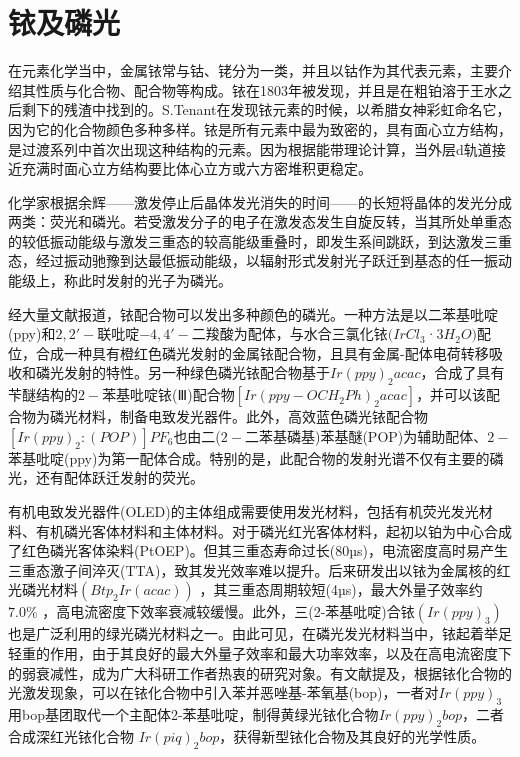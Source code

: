 \documentclass[UTF8,a4paper,10pt,twocolumn]{ctexart}
\begin{document}
\title{{\Huge{}}}
\author{\textbf{171240013 \space 于紫雯  \space 霍然  \space 刘宇杰}}
\date{}
\maketitle

\section{铱及磷光}
在元素化学当中，金属铱常与钴、铑分为一类，并且以钴作为其代表元素，主要介绍其性质与化合物、配合物等构成。铱在1803年被发现，并且是在粗铂溶于王水之后剩下的残渣中找到的。S.Tenant在发现铱元素的时候，以希腊女神彩虹命名它，因为它的化合物颜色多种多样。铱是所有元素中最为致密的，具有面心立方结构，是过渡系列中首次出现这种结构的元素。因为根据能带理论计算，当外层d轨道接近充满时面心立方结构要比体心立方或六方密堆积更稳定。

化学家根据余辉——激发停止后晶体发光消失的时间——的长短将晶体的发光分成两类：荧光和磷光。若受激发分子的电子在激发态发生自旋反转，当其所处单重态的较低振动能级与激发三重态的较高能级重叠时，即发生系间跳跃，到达激发三重态，经过振动驰豫到达最低振动能级，以辐射形式发射光子跃迁到基态的任一振动能级上，称此时发射的光子为磷光。

经大量文献报道，铱配合物可以发出多种颜色的磷光。一种方法是以二苯基吡啶(ppy)和$2,2'-$联吡啶$-4,4'-$二羧酸为配体，与水合三氯化铱$(IrCl_3$·$3H_2O)$配位，合成一种具有橙红色磷光发射的金属铱配合物，且具有金属-配体电荷转移吸收和磷光发射的特性。另一种绿色磷光铱配合物基于$Ir(ppy)_2acac$，合成了具有苄醚结构的$2-$苯基吡啶铱(Ⅲ)配合物$[Ir(ppy- OCH_2Ph)_2acac]$，并可以该配合物为磷光材料，制备电致发光器件。此外，高效蓝色磷光铱配合物$[Ir(ppy)_2:(POP)]PF_6$也由二($2-$二苯基磷基)苯基醚(POP)为辅助配体、$2-$苯基吡啶(ppy)为第一配体合成。特别的是，此配合物的发射光谱不仅有主要的磷光，还有配体跃迁发射的荧光。 

有机电致发光器件(OLED)的主体组成需要使用发光材料，包括有机荧光发光材料、有机磷光客体材料和主体材料。对于磷光红光客体材料，起初以铂为中心合成了红色磷光客体染料(PtOEP)。但其三重态寿命过长(80µs)，电流密度高时易产生三重态激子间淬灭(TTA)，致其发光效率难以提升。后来研发出以铱为金属核的红光磷光材料$(Btp_2Ir(acac))$ ，其三重态周期较短(4µs)，最大外量子效率约$7.0 \%$ ，高电流密度下效率衰减较缓慢。此外，三(2-苯基吡啶)合铱$(Ir(ppy)_3)$也是广泛利用的绿光磷光材料之一。由此可见，在磷光发光材料当中，铱起着举足轻重的作用，由于其良好的最大外量子效率和最大功率效率，以及在高电流密度下的弱衰减性，成为广大科研工作者热衷的研究对象。有文献提及，根据铱化合物的光激发现象，可以在铱化合物中引入苯并恶唑基-苯氧基(bop)，一者对$Ir(ppy)_3$用bop基团取代一个主配体2-苯基吡啶，制得黄绿光铱化合物$Ir(ppy)_2bop$，二者合成深红光铱化合物 $Ir(piq)_2bop$，获得新型铱化合物及其良好的光学性质。
\end{document}
